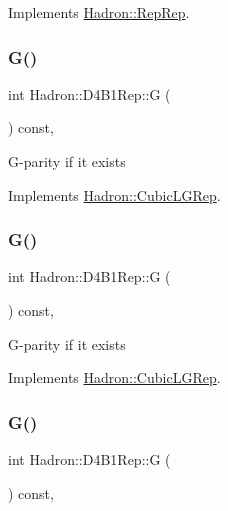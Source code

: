 Implements \mbox{\hyperlink{structHadron_1_1RepRep_a92c8802e5ed7afd7da43ccfd5b7cd92b}{Hadron\+::\+Rep\+Rep}}.

\mbox{\label{structHadron_1_1D4B1Rep_aac5f086b96bd21a570788d9ffb92dbca}} 
\subsubsection{\texorpdfstring{G()}{G()}\hspace{0.1cm}{\footnotesize\ttfamily [1/3]}}
{\footnotesize\ttfamily int Hadron\+::\+D4\+B1\+Rep\+::G (\begin{DoxyParamCaption}{ }\end{DoxyParamCaption}) const\hspace{0.3cm}{\ttfamily [inline]}, {\ttfamily [virtual]}}

G-\/parity if it exists 

Implements \mbox{\hyperlink{structHadron_1_1CubicLGRep_ace26f7b2d55e3a668a14cb9026da5231}{Hadron\+::\+Cubic\+L\+G\+Rep}}.

\mbox{\label{structHadron_1_1D4B1Rep_aac5f086b96bd21a570788d9ffb92dbca}} 
\subsubsection{\texorpdfstring{G()}{G()}\hspace{0.1cm}{\footnotesize\ttfamily [2/3]}}
{\footnotesize\ttfamily int Hadron\+::\+D4\+B1\+Rep\+::G (\begin{DoxyParamCaption}{ }\end{DoxyParamCaption}) const\hspace{0.3cm}{\ttfamily [inline]}, {\ttfamily [virtual]}}

G-\/parity if it exists 

Implements \mbox{\hyperlink{structHadron_1_1CubicLGRep_ace26f7b2d55e3a668a14cb9026da5231}{Hadron\+::\+Cubic\+L\+G\+Rep}}.

\mbox{\label{structHadron_1_1D4B1Rep_aac5f086b96bd21a570788d9ffb92dbca}} 
\subsubsection{\texorpdfstring{G()}{G()}\hspace{0.1cm}{\footnotesize\ttfamily [3/3]}}
{\footnotesize\ttfamily int Hadron\+::\+D4\+B1\+Rep\+::G (\begin{DoxyParamCaption}{ }\end{DoxyParamCaption}) const\hspace{0.3cm}{\ttfamily [inline]}, {\ttfamily [virtual]}}

